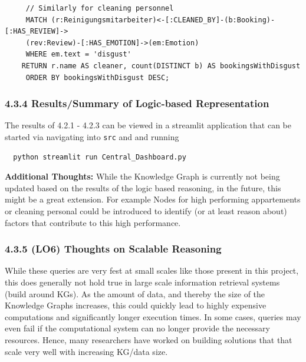\documentclass[
]{article}
\begin{document}
\vspace*{10mm}

\begin{lstlisting}
     // Similarly for cleaning personnel
     MATCH (r:Reinigungsmitarbeiter)<-[:CLEANED_BY]-(b:Booking)-[:HAS_REVIEW]->
     (rev:Review)-[:HAS_EMOTION]->(em:Emotion)
     WHERE em.text = 'disgust'
    RETURN r.name AS cleaner, count(DISTINCT b) AS bookingsWithDisgust
     ORDER BY bookingsWithDisgust DESC;
\end{lstlisting}

\pagebreak


\subsubsection{4.3.4 Results/Summary of Logic-based
Representation}\label{resultssummary-of-logic-based-representation}

The results of 4.2.1 - 4.2.3 can be viewed in a streamlit application
that can be started via navigating into \texttt{src} and and running

\begin{lstlisting}
  python streamlit run Central_Dashboard.py
\end{lstlisting}


\textbf{Additional Thoughts:} While the Knowledge Graph is currently not
being updated based on the results of the logic based reasoning, in the
future, this might be a great extension. For example Nodes for high
performing appartements or cleaning personal could be introduced to
identify (or at least reason about) factors that contribute to this high
performance.

\subsubsection{4.3.5 (LO6) Thoughts on Scalable
Reasoning}\label{thoughts-on-scalable-reasoning}

While these queries are very fest at small scales like those present in
this project, this does generally not hold true in large scale
information retrieval systems (build around KGs). As the amount of data,
and thereby the size of the Knowledge Graphs increases, this could
quickly lead to highly expensive computations and significantly longer
execution times. In some cases, queries may even fail if the
computational system can no longer provide the necessary resources.
Hence, many researchers have worked on building solutions that that
scale very well with increasing KG/data size.
\end{document}
